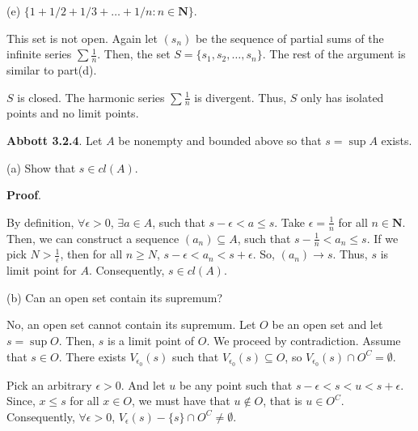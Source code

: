 \documentclass[10pt]{article}
\begin{document}
(e) $\displaystyle \{1+1/2+1/3+\dotsc +1/n:n\in \mathbf{N}\}$.



This set is not open. Again let $\displaystyle ( s_{n})$ be the sequence of partial sums of the infinite series $\displaystyle \sum \frac{1}{n}$. Then, the set $\displaystyle S=\{s_{1} ,s_{2} ,\dotsc ,s_{n}\}$. The rest of the argument is similar to part(d).



$\displaystyle S$ is closed. The harmonic series $\displaystyle \sum \frac{1}{n}$ is divergent. Thus, $\displaystyle S$ only has isolated points and no limit points. 



\textbf{Abbott 3.2.4}. Let $\displaystyle A$ be nonempty and bounded above so that $\displaystyle s=\sup A$ exists.



(a) Show that $\displaystyle s\in cl( A)$.



\textbf{Proof}.



By definition, $\displaystyle \forall \epsilon  >0$, $\displaystyle \exists a\in A$, such that $\displaystyle s-\epsilon < a\leq s$. Take $\displaystyle \epsilon =\frac{1}{n}$ for all $\displaystyle n\in \mathbf{N}$. Then, we can construct a sequence $\displaystyle ( a_{n}) \subseteq A$, such that $\displaystyle s-\frac{1}{n} < a_{n} \leq s$. If we pick $\displaystyle N >\frac{1}{\epsilon }$, then for all $\displaystyle n\geq N$, $\displaystyle s-\epsilon < a_{n} < s+\epsilon $. So, $\displaystyle ( a_{n})\rightarrow s$. Thus, $\displaystyle s$ is limit point for $\displaystyle A$. Consequently, $\displaystyle s\in cl( A)$.



(b) Can an open set contain its supremum?



No, an open set cannot contain its supremum. Let $\displaystyle O$ be an open set and let $\displaystyle s=\sup O$. Then, $\displaystyle s$ is a limit point of $\displaystyle O$. We proceed by contradiction. Assume that $\displaystyle s\in O$. There exists $\displaystyle V_{\epsilon _{0}}( s)$ such that $\displaystyle V_{\epsilon _{0}}( s) \subseteq O$, so $\displaystyle V_{\epsilon _{0}}( s) \cap O^{C} =\emptyset $. 



Pick an arbitrary $\displaystyle \epsilon  >0$. And let $\displaystyle u$ be any point such that $\displaystyle s-\epsilon < s< u< s+\epsilon $. Since, $\displaystyle x\leq s$ for all $\displaystyle x\in O$, we must have that $\displaystyle u\notin O$, that is $\displaystyle u\in O^{C}$. Consequently, $\displaystyle \forall \epsilon  >0$, $\displaystyle V_{\epsilon }( s) -\{s\} \cap O^{C} \neq \emptyset $. 
\end{document}
